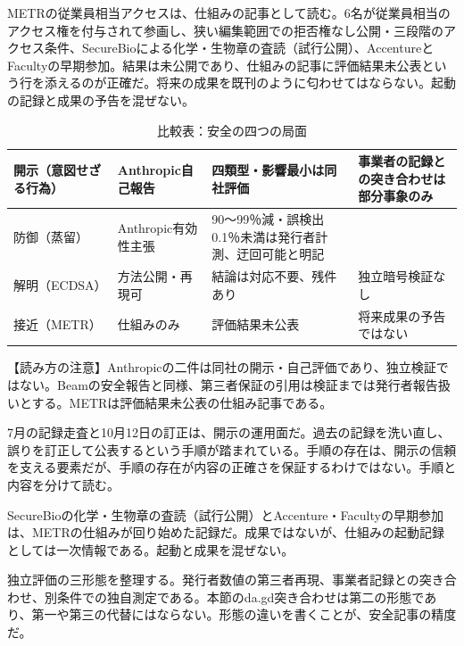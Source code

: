 \documentclass[lualatex,a4paper,10pt]{jlreq}
\begin{document}
METRの従業員相当アクセスは、仕組みの記事として読む。6名が従業員相当のアクセス権を付与されて参画し、狭い編集範囲での拒否権なし公開・三段階のアクセス条件、SecureBioによる化学・生物章の査読（試行公開）、AccentureとFacultyの早期参加。結果は未公開であり、仕組みの記事に評価結果未公表という行を添えるのが正確だ。将来の成果を既刊のように匂わせてはならない。起動の記録と成果の予告を混ぜない。
\cite{B39,B82}


\begin{table}[htbp]\centering\footnotesize
\caption{比較表：安全の四つの局面}
\begin{tabularx}{0.96\linewidth}{@{}lXXX@{}}
\toprule
開示（意図せざる行為） & Anthropic自己報告 & 四類型・影響最小は同社評価 & 事業者の記録との突き合わせは部分事象のみ \cite{B40,B79} \\
\midrule
防御（蒸留） & Anthropic有効性主張 & 90〜99％減・誤検出0.1％未満は発行者計測、迂回可能と明記 \cite{B41,B80} \\
\midrule
解明（ECDSA） & 方法公開・再現可 & 結論は対応不要、残件あり & 独立暗号検証なし \cite{B42,B81} \\
\midrule
接近（METR） & 仕組みのみ & 評価結果未公表 & 将来成果の予告ではない \cite{B39,B82} \\
\bottomrule
\end{tabularx}
\end{table}

\begin{tcolorbox}[colback=SurveySoft,colframe=SurveyRule,arc=1mm,boxrule=0.4pt,left=2mm,right=2mm]
【読み方の注意】Anthropicの二件は同社の開示・自己評価であり、独立検証ではない。Beamの安全報告と同様、第三者保証の引用は検証までは発行者報告扱いとする。METRは評価結果未公表の仕組み記事である。
\end{tcolorbox}
\cite{B40,B79,B41,B80,B42,B81,B39,B82}

7月の記録走査と10月12日の訂正は、開示の運用面だ。過去の記録を洗い直し、誤りを訂正して公表するという手順が踏まれている。手順の存在は、開示の信頼を支える要素だが、手順の存在が内容の正確さを保証するわけではない。手順と内容を分けて読む。
\cite{B40,B79}


SecureBioの化学・生物章の査読（試行公開）とAccenture・Facultyの早期参加は、METRの仕組みが回り始めた記録だ。成果ではないが、仕組みの起動記録としては一次情報である。起動と成果を混ぜない。
\cite{B39,B82}


独立評価の三形態を整理する。発行者数値の第三者再現、事業者記録との突き合わせ、別条件での独自測定である。本節のda.gd突き合わせは第二の形態であり、第一や第三の代替にはならない。形態の違いを書くことが、安全記事の精度だ。
\cite{B40,B79}
\end{document}
